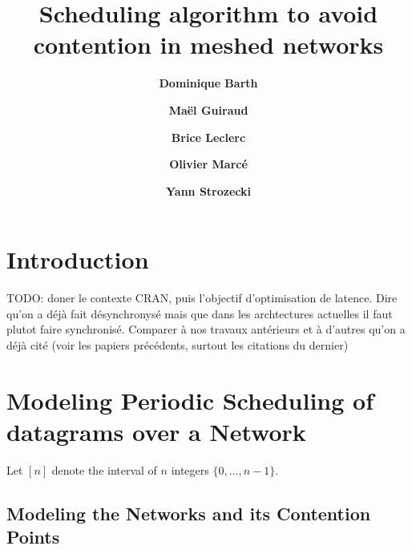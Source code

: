 \documentclass[english]{article}
\begin{document}
\title{Scheduling algorithm to avoid contention in meshed networks}
 

\newcommand{\todo}[1]{{\color{red} TODO: {#1}}}
\newcommand{\spall}{\textsc{SPALL}\xspace}
\newtheorem{theorem}{Theorem}
\newtheorem{lemma}[theorem]{Lemma}
\newtheorem{definition}{Definition}
\newtheorem{corollary}{Corollary}
\author[1]{\bf{ {Dominique Barth}}}
\author[1,2]{\bf{ {Ma\"el Guiraud}}}
\author[2]{\bf{ {Brice Leclerc}}}
\author[2]{\bf{ {Olivier Marc\'e}}}
\author[1]{\bf{ {Yann Strozecki}}}




\maketitle

\section*{Introduction}

TODO: doner le contexte CRAN, puis l'objectif d'optimisation de latence. 
Dire qu'on a déjà fait désynchronysé mais que dans les archtectures actuelles il faut plutot faire synchronisé.
Comparer à nos travaux antérieurs et à d'autres qu'on a déjà cité (voir les papiers précédents, surtout les citations du dernier)




\section{Modeling Periodic Scheduling of datagrams over a Network}


Let $[n]$ denote the interval of $n$ integers $\{0,\dots,n-1\}$.

  \subsection{Modeling the Networks and its Contention Points}
\end{document}
